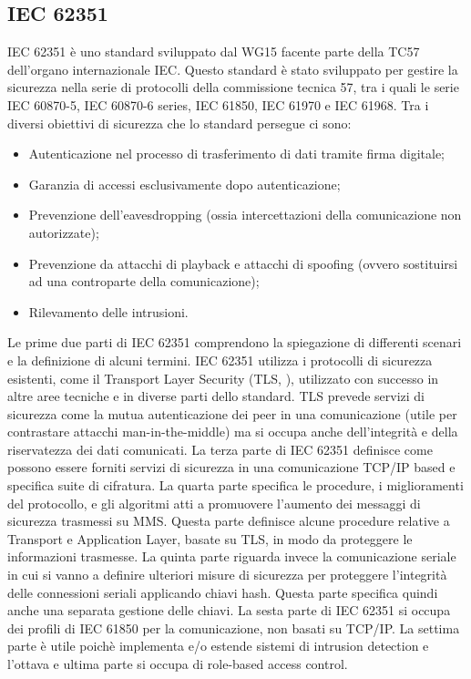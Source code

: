 \subsection{IEC 62351}
IEC 62351 è uno standard sviluppato dal WG15 facente parte della TC57 dell'organo internazionale IEC. Questo standard è stato sviluppato per gestire la sicurezza nella serie di protocolli della commissione tecnica 57, tra i quali le serie IEC 60870-5, IEC 60870-6 series, IEC 61850, IEC 61970 e IEC 61968.\newpage
Tra i diversi obiettivi di sicurezza che lo standard persegue ci sono:
\begin{itemize}
	\item Autenticazione nel processo di trasferimento di dati tramite firma digitale;
	\item Garanzia di accessi esclusivamente dopo autenticazione;
	\item Prevenzione dell'eavesdropping (ossia intercettazioni della comunicazione non autorizzate);
	\item Prevenzione da attacchi di playback e attacchi di spoofing (ovvero sostituirsi ad una controparte della comunicazione);
	\item Rilevamento delle intrusioni.
\end{itemize}
Le prime due parti di IEC 62351 comprendono la spiegazione di differenti scenari e la definizione di alcuni termini. IEC 62351 utilizza i protocolli di sicurezza esistenti, come il Transport Layer Security (TLS, \cite{tls}), utilizzato con successo in altre aree tecniche e in diverse parti dello standard. TLS prevede servizi di sicurezza come la mutua autenticazione dei peer in una comunicazione (utile per contrastare attacchi man-in-the-middle) ma si occupa anche dell'integrità e della riservatezza dei dati comunicati. La terza parte di IEC 62351 definisce come possono essere forniti servizi di sicurezza in una  comunicazione TCP/IP based e specifica suite di cifratura. La quarta parte specifica le procedure, i miglioramenti del protocollo, e gli algoritmi atti a promuovere l'aumento dei messaggi di sicurezza trasmessi su MMS. Questa parte definisce alcune procedure relative a Transport e Application Layer, basate su TLS, in modo da proteggere le informazioni trasmesse. La quinta parte riguarda invece la comunicazione seriale in cui si vanno a definire ulteriori misure di sicurezza per proteggere l'integrità delle connessioni seriali applicando chiavi hash. Questa parte specifica quindi anche una separata gestione delle chiavi. La sesta parte di IEC 62351 si occupa dei profili di IEC 61850 per la comunicazione, non basati su TCP/IP. La settima parte è utile poichè implementa e/o estende sistemi di intrusion detection e l'ottava e ultima parte si occupa di role-based access control.


